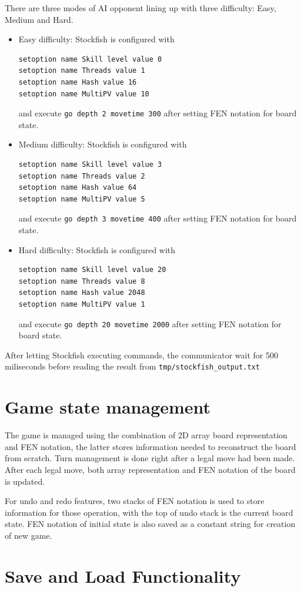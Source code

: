 \documentclass[a4paper, 10pt, titlepage]{report}
\begin{document}
There are three modes of AI opponent lining up with three difficulty: Easy, Medium and Hard.
\begin{itemize}
  \item Easy difficulty: Stockfish is configured with \begin{verbatim}
setoption name Skill level value 0
setoption name Threads value 1     
setoption name Hash value 16      
setoption name MultiPV value 10    
\end{verbatim} and execute \texttt{go depth 2 movetime 300} after setting FEN notation for board state.
  \item Medium difficulty: Stockfish is configured with \begin{verbatim}
setoption name Skill level value 3
setoption name Threads value 2     
setoption name Hash value 64      
setoption name MultiPV value 5    
\end{verbatim} and execute \texttt{go depth 3 movetime 400} after setting FEN notation for board state.
  \item Hard difficulty: Stockfish is configured with \begin{verbatim}
setoption name Skill level value 20
setoption name Threads value 8     
setoption name Hash value 2048      
setoption name MultiPV value 1    
\end{verbatim} and execute \texttt{go depth 20 movetime 2000} after setting FEN notation for board state.
\end{itemize}
After letting Stockfish executing commands, the communicator wait for 500 miliseconds before reading the result from \texttt{tmp/stockfish\_output.txt}
\section{Game state management}
The game is managed using the combination of 2D array board representation and FEN notation, the latter stores information needed to reconstruct the board from scratch. Turn management is done right after a legal move had been made. After each legal move, both array representation and FEN notation of the board is updated.

For undo and redo features, two stacks of FEN notation is used to store information for those operation, with the top of undo stack is the current board state. FEN notation of initial state is also saved as a constant string for creation of new game.

\section{Save and Load Functionality}
\end{document}

